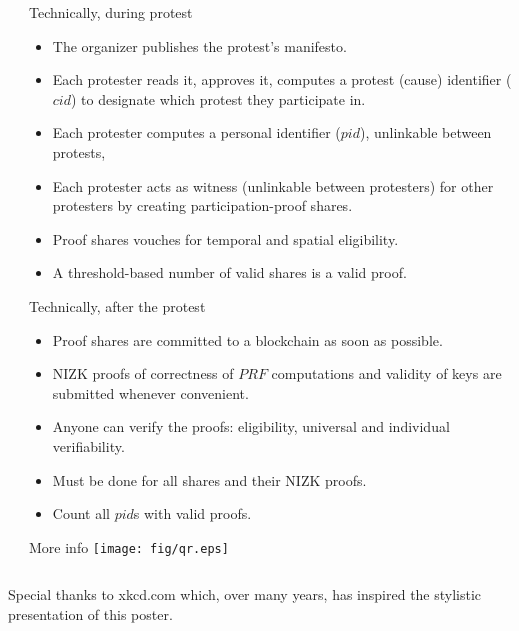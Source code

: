 \begin{columns}[t]
\begin{column}{0.32\linewidth}
  \end{column}

  \hfill

  \begin{column}{0.32\linewidth}

    \begin{blackblock}{Technically, during protest}
      \begin{itemize}
        \item The organizer publishes the protest's manifesto.
        \item Each protester reads it, approves it, computes a protest (cause) 
          identifier (\(cid\)) to designate which protest they participate in.
        \item Each protester computes a personal identifier (\(pid\)), 
          unlinkable between protests,
        \item Each protester acts as witness (unlinkable between protesters) for 
          other protesters by creating participation-proof shares.
        \item Proof shares vouches for temporal and spatial eligibility.
        \item A threshold-based number of valid shares is a valid proof.
      \end{itemize}
    \end{blackblock}

    \begin{blackblock}{Technically, after the protest}
      \begin{itemize}
        \item Proof shares are committed to a blockchain as soon as possible.
        \item \Ac{NIZK} proofs of correctness of \(PRF\) computations and 
          validity of keys are submitted whenever convenient.
        \item Anyone can verify the proofs: eligibility, universal and 
          individual verifiability.
        \item Must be done for all shares and their \ac{NIZK} proofs.
        \item Count all \(pid\)s with valid proofs.
      \end{itemize}
    \end{blackblock}

    \begin{block}{More info}
      \centering
      \texttt{[image: fig/qr.eps]}
    \end{block}

    \printbibliography[heading=none]

  \end{column}

\end{columns}

\vfill
\flushright{}
Special thanks to xkcd.com which, over many years, has inspired the stylistic 
presentation of this poster.
